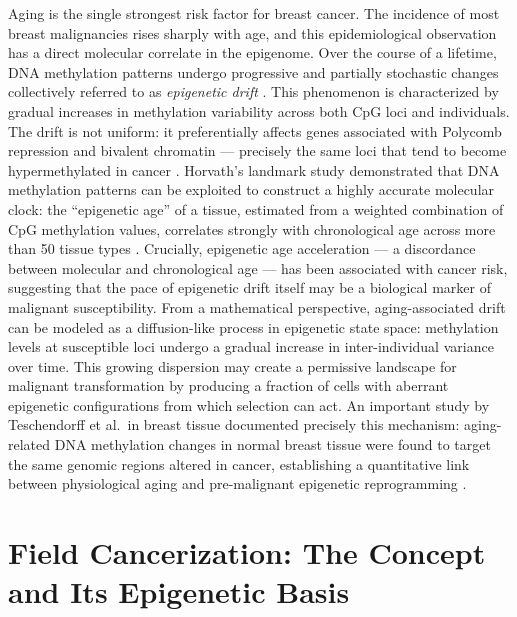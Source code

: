 Aging is the single strongest risk factor for breast cancer. The incidence of most
breast malignancies rises sharply with age, and this epidemiological observation
has a direct molecular correlate in the epigenome.
Over the course of a lifetime, DNA methylation patterns undergo progressive and
partially stochastic changes collectively referred to as \textit{epigenetic drift}
\cite{Horvath2013}. This phenomenon is characterized by gradual increases in
methylation variability across both CpG loci and individuals. The drift is not
uniform: it preferentially affects genes associated with Polycomb repression and
bivalent chromatin — precisely the same loci that tend to become hypermethylated
in cancer \cite{Teschendorff2010,Teschendorff2010_stemcell}.
Horvath's landmark study demonstrated that DNA methylation patterns can be
exploited to construct a highly accurate molecular clock: the ``epigenetic age''
of a tissue, estimated from a weighted combination of CpG methylation values,
correlates strongly with chronological age across more than 50 tissue types
\cite{Horvath2013}. Crucially, epigenetic age acceleration — a discordance between
molecular and chronological age — has been associated with cancer risk, suggesting
that the pace of epigenetic drift itself may be a biological marker of malignant
susceptibility.
From a mathematical perspective, aging-associated drift can be modeled as a
diffusion-like process in epigenetic state space: methylation levels at susceptible
loci undergo a gradual increase in inter-individual variance over time. This growing
dispersion may create a permissive landscape for malignant transformation by
producing a fraction of cells with aberrant epigenetic configurations from which
selection can act.
An important study by Teschendorff et al.\ in breast tissue documented precisely
this mechanism: aging-related DNA methylation changes in normal breast tissue
were found to target the same genomic regions altered in cancer, establishing a
quantitative link between physiological aging and pre-malignant epigenetic
reprogramming \cite{Teschendorff2019}.


\section{Field Cancerization: The Concept and Its Epigenetic Basis}

